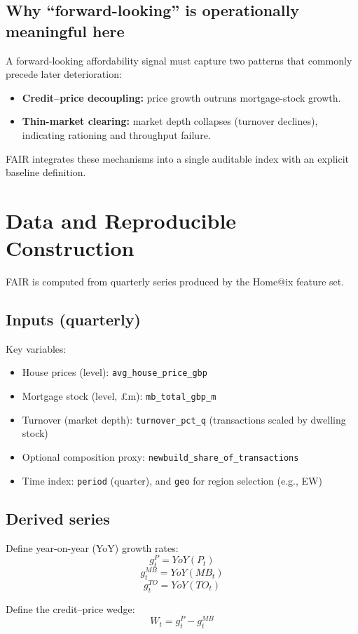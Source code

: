 \documentclass[11pt,a4paper]{article}
\begin{document}
\subsection{Why ``forward-looking'' is operationally meaningful here}
A forward-looking affordability signal must capture two patterns that commonly precede later deterioration:
\begin{itemize}
  \item \textbf{Credit--price decoupling:} price growth outruns mortgage-stock growth.
  \item \textbf{Thin-market clearing:} market depth collapses (turnover declines), indicating rationing and throughput failure.
\end{itemize}

FAIR integrates these mechanisms into a single auditable index with an explicit baseline definition.

\section{Data and Reproducible Construction}
FAIR is computed from quarterly series produced by the Home@ix feature set.

\subsection{Inputs (quarterly)}
Key variables:
\begin{itemize}
  \item House prices (level): \texttt{avg\_house\_price\_gbp}
  \item Mortgage stock (level, \pounds m): \texttt{mb\_total\_gbp\_m}
  \item Turnover (market depth): \texttt{turnover\_pct\_q} (transactions scaled by dwelling stock)
  \item Optional composition proxy: \texttt{newbuild\_share\_of\_transactions}
  \item Time index: \texttt{period} (quarter), and \texttt{geo} for region selection (e.g., EW)
\end{itemize}

\subsection{Derived series}
Define year-on-year (YoY) growth rates:
$$
g_t^P = YoY(P_t)
$$
$$
g_t^{MB} = YoY(MB_t)
$$
$$
g_t^{TO} = YoY(TO_t)
$$

Define the credit--price wedge:
$$
W_t = g_t^P - g_t^{MB}
$$
\end{document}
